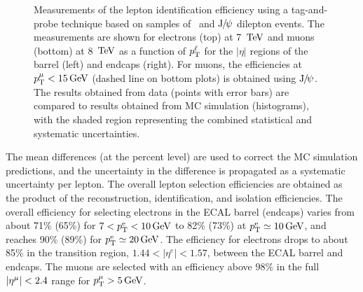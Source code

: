 \documentclass[11pt,twoside,a4paper,cmspaper,final,collab]{cms-tdr}
\begin{document}
\begin{figure}[htbp]
\begin{center}
     \caption{
     Measurements of the lepton identification efficiency using a tag-and-probe
     technique based on samples of \cPZ\  and $\mathrm{J}\hspace{-.08em}/\hspace{-.14em}\psi$ dilepton events. The measurements
     are shown for electrons (top) at 7 $\,\text{Te\hspace{-.08em}V}$ and muons (bottom) at 8 $\,\text{Te\hspace{-.08em}V}$ as a function of $p_{\mathrm{T}}^{\ell} $ for
     the $ |\eta| $ regions of the barrel (left) and endcaps (right).
     For muons, the efficiencies at $p_{\mathrm{T}}^{\mu} < 15\,\text{Ge\hspace{-.08em}V}$ (dashed line on bottom plots)
     is obtained using $\mathrm{J}\hspace{-.08em}/\hspace{-.14em}\psi$.
     The results obtained from data (points with error bars) are compared to results
     obtained from MC simulation (histograms), with the shaded region representing
     the combined statistical and systematic uncertainties.
           }
    \label{fig:leptonTP}
   \end{center}
\end{figure}
The  mean differences (at the percent level) are used to correct the MC simulation predictions, and the uncertainty in the difference is
propagated as a systematic uncertainty per lepton.
The overall lepton selection efficiencies are obtained as the product of the reconstruction, identification,
and isolation efficiencies.
The overall efficiency for selecting electrons in the ECAL barrel (endcaps) varies from
about  71\% (65\%) for $7 < p_{\mathrm{T}}^{\mathrm{e}} < 10\,\text{Ge\hspace{-.08em}V}$ to  82\% (73\%) at $p_{\mathrm{T}}^{\mathrm{e}} \simeq 10\,\text{Ge\hspace{-.08em}V}$,
and reaches 90\% (89\%) for $p_{\mathrm{T}}^{\mathrm{e}} \simeq 20\,\text{Ge\hspace{-.08em}V}$.
The efficiency for electrons drops to about 85\% in the transition region, $1.44 < |\eta^e| < 1.57$, between
the ECAL barrel and endcaps.
The muons are selected with an efficiency above $98\%$ in the full $|\eta^{{\mu}}| < 2.4$ range
for $p_{\mathrm{T}}^{\mu} > 5\,\text{Ge\hspace{-.08em}V}$.
\end{document}
